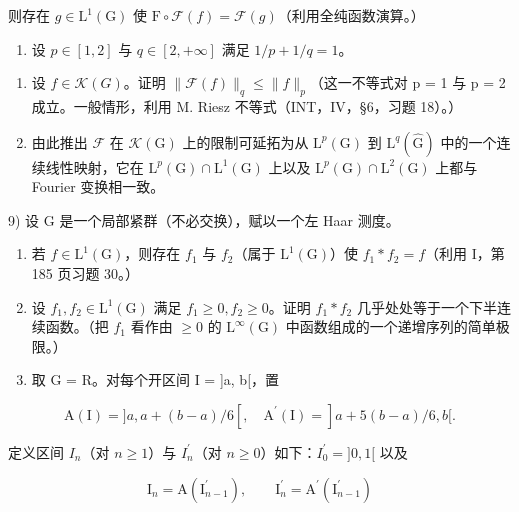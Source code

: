 则存在 \(g \in \mathrm{L}^{1}(\mathrm{G})\) 使 \(\mathrm{F} \circ \mathcal{F}(f) = \mathcal{F}(g)\)（利用全纯函数演算。）

\begin{enumerate}
\def\labelenumi{\arabic{enumi})}
\setcounter{enumi}{7}
\tightlist
\item
  设 \(p \in [1,2]\) 与 \(q \in [2, +\infty]\) 满足 \(1/p + 1/q = 1\)。
\end{enumerate}

\begin{enumerate}
\def\labelenumi{\alph{enumi})}
\item
  设 \(f \in \mathcal{K}(G)\)。证明 \(\|\mathcal{F}(f)\|_{q} \leqslant \|f\|_{p}\)（这一不等式对 p = 1 与 p = 2 成立。一般情形，利用 M. Riesz 不等式（INT，IV，§6，习题 18）。）
\item
  由此推出 \(\mathcal{F}\) 在 \(\mathcal{K}(\mathrm{G})\) 上的限制可延拓为从 \(\mathrm{L}^p (\mathrm{G})\) 到 \(\mathrm{L}^q (\widehat{\mathrm{G}})\) 中的一个连续线性映射，它在 \(\mathrm{L}^p (\mathrm{G})\cap \mathrm{L}^1 (\mathrm{G})\) 上以及 \(\mathrm{L}^p (\mathrm{G})\cap \mathrm{L}^2 (\mathrm{G})\) 上都与 Fourier 变换相一致。
\end{enumerate}

9) 设 G 是一个局部紧群（不必交换），赋以一个左 Haar 测度。

\begin{enumerate}
\def\labelenumi{\alph{enumi})}
\item
  若 \(f \in \mathrm{L}^{1}(\mathrm{G})\)，则存在 \(f_{1}\) 与 \(f_{2}\)（属于 \(\mathrm{L}^{1}(\mathrm{G})\)）使 \(f_{1} * f_{2} = f\)（利用 I，第 185 页习题 30。）
\item
  设 \(f_{1}, f_{2} \in \mathrm{L}^{1}(\mathrm{G})\) 满足 \(f_{1} \geqslant 0, f_{2} \geqslant 0\)。证明 \(f_{1} * f_{2}\) 几乎处处等于一个下半连续函数。（把 \(f_{1}\) 看作由 \(\geqslant 0\) 的 \(\mathrm{L}^{\infty}(\mathrm{G})\) 中函数组成的一个递增序列的简单极限。）
\item
  取 G = R。对每个开区间 I = {]}a, b{[}，置
\end{enumerate}

\[
\mathrm{A} (\mathrm{I}) = ] a, a + (b - a) / 6 [, \quad \mathrm{A} ^ {\prime} (\mathrm{I}) = ] a + 5 (b - a) / 6, b [.
\]

定义区间 \(I_{n}\)（对 \(n \geqslant 1\)）与 \(I_{n}^{\prime}\)（对 \(n \geqslant 0\)）如下：\(I_{0}^{\prime} = ]0, 1[\) 以及

\[
\mathrm{I} _ {n} = \mathrm{A} (\mathrm{I} _ {n - 1} ^ {\prime}), \qquad \mathrm{I} _ {n} ^ {\prime} = \mathrm{A} ^ {\prime} (\mathrm{I} _ {n - 1} ^ {\prime})
\]

